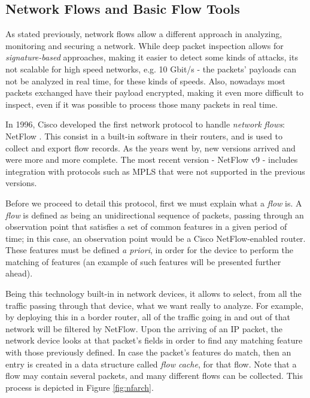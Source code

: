 \documentclass[runningheads,a4paper]{llncs}
\begin{document}
\subsection{Network Flows and Basic Flow Tools}\label{ssec:tools}

As stated previously, network flows allow a different approach in analyzing, monitoring and securing a network. While deep packet inspection allows for \textit{signature-based} approaches, making it easier to detect some kinds of attacks, its not scalable for high speed networks, e.g. 10 Gbit/s \cite{Sperotto2010} - the packets' payloads can not be analyzed in real time, for these kinds of speeds. Also, nowadays most packets exchanged have their payload encrypted, making it even more difficult to inspect, even if it was possible to process those many packets in real time. 


In 1996, Cisco developed the first network protocol to handle \textit{network flows}: NetFlow \cite{Claise2004}. This consist in a built-in software in their routers, and is used to collect and export flow records. As the years went by, new versions arrived and were more and more complete. The most recent version - NetFlow v9 - includes integration with protocols such as MPLS that were not supported in the previous versions.


Before we proceed to detail this protocol, first we must explain what a \textit{flow} is. A \textit{flow} is defined as being an unidirectional sequence of packets, passing through an observation point that satisfies a set of common features in a given period of time;  in this case, an observation point would be a Cisco NetFlow-enabled router. These features must be defined \textit{a priori}, in order for the device to perform the matching of features (an example of such features will be presented further ahead). 

Being this technology built-in in network devices, it allows to select, from all the traffic passing through that device, what we want really to analyze. For example, by deploying this in a border router, all of the traffic going in and out of that network will be filtered by NetFlow. Upon the arriving of an IP packet, the network device looks at that packet's fields in order to find any matching feature with those previously defined. In case the packet's features do match, then an entry is created in a data structure called \textit{flow cache}, for that flow. Note that a flow may contain several packets, and many different flows can be collected. This process is depicted in Figure \ref{fig:nfarch}.
\end{document}
